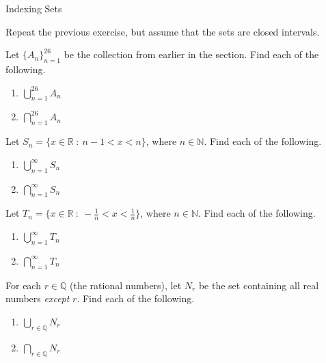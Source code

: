 \begin{section}{Indexing Sets}
\begin{exercise}
Repeat the previous exercise, but assume that the sets are closed intervals.
\end{exercise}

\begin{exercise}
Let $\{A_n\}_{n=1}^{26}$ be the collection from earlier in the section.  Find each of the following.
\begin{enumerate}
\item $\displaystyle \bigcup_{n=1}^{26}A_n$
\item $\displaystyle \bigcap_{n=1}^{26}A_n$
\end{enumerate}
\end{exercise}

\begin{exercise}
Let $S_n = \{x \in \mathbb{R} \ : \ n-1<x<n \}$, where $n\in \mathbb{N}$.  Find each of the following.
\begin{enumerate}
\item $\displaystyle \bigcup_{n=1}^{\infty}S_n$

\item $\displaystyle \bigcap_{n=1}^{\infty}S_n$
\end{enumerate}
\end{exercise}

\begin{exercise}
Let $T_n = \{x \in \mathbb{R} \ : \ -\frac{1}{n}<x< \frac{1}{n} \}$, where $n\in \mathbb{N}$.  Find each of the following.
\begin{enumerate}
\item $\displaystyle \bigcup_{n=1}^{\infty}T_n$

\item $\displaystyle \bigcap_{n=1}^{\infty}T_n$
\end{enumerate}

\end{exercise}

\begin{exercise}
For each $r\in\mathbb{Q}$ (the rational numbers), let $N_r$ be the set containing all real numbers \emph{except} $r$.  Find each of the following.
\begin{enumerate}
\item $\displaystyle \bigcup_{r\in\mathbb{Q}}N_r$

\item $\displaystyle \bigcap_{r\in\mathbb{Q}}N_r$
\end{enumerate}

\end{exercise}


\end{section}
